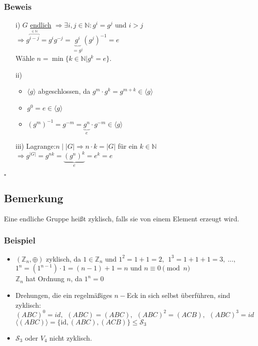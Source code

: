 \documentclass[12pt,titlepage, pdf]{article}
\newcommand{\uline}[1]{\underline{#1}}
\newcommand{\id}{\textrm{id}}
\renewcommand{\>}{\rightarrow}
\renewcommand{\*}{\cdot}
\begin{document}
	\subsubsection*{Beweis}
	\begin{itemize}
		\item[i)] $G$ \uline{endlich} $\Rightarrow \exists i,j \in \mathds{N}: g^i = g^j$ und $i > j$ \\
		\noindent\hspace*{17.5mm}$\Rightarrow g^{\overbracket{i-j}^{ \in \mathds{N}}} = g^i g^{-j} = \underbrace{g^i}_{=g^j} (g^j)^{-1} = e$ \\
		Wähle $n =\min\{k \in \mathds{N}| g^k = e \}$.
		\item[ii)] 
		\begin{itemize}
			\item $\langle g \rangle$ abgeschlossen, da $g^m \cdot g^k = g^{m+k} \in \langle g \rangle$ 
			\item $g^0 = e \in \langle g \rangle$
			\item $(g^m)^{-1} = g^{-m} = \underbrace{g^n}_{e} \cdot g^{-m} \in \langle g \rangle$
		\end{itemize}
		\item[iii)] Lagrange:\quad $n \mid |G| \Rightarrow n \cdot k = | G |$ für ein $k  \in \mathds{N}$\\
		\noindent\hspace*{32mm}$\Rightarrow g^{|G|} = g^{nk} =\underbrace{(g^n)^k}_{e} = e^k = e$
	\end{itemize}\hfill$\square$
	\subsection{Bemerkung}
	Eine endliche Gruppe heißt zyklisch, falls sie von einem Element erzeugt wird.
	\subsubsection*{Beispiel}
	\begin{itemize}
		\item $(\mathds{Z}_n, \oplus)$ zyklisch, da $1 \in \mathds{Z}_n$ und $1^2 = 1 + 1 = 2,~~ 1^3 = 1 + 1 +1 = 3,~...,$\\$ 1^n = (1^{n-1}) \cdot 1 = (n -1) + 1 = n\textrm{ und } n \equiv 0 \pmod{n}$ \\
		$\mathds{Z}_n$ hat Ordnung $n$, da $1^n = 0$
		\item Drehungen, die ein regelmäßiges $n-$Eck in sich selbst überführen, sind zyklisch: \\
		$(ABC)^0 = id,~~ (ABC) = (ABC),~~ (ABC)^2 = (ACB),~~ (ABC)^3 = id$\\
		$\langle (ABC) \rangle = \{\id, (ABC), (ACB)\} \leq \mathscr{S}_3$
		\item $\mathscr{S}_3$ oder $V_4$ nicht zyklisch.
	\end{itemize}
\end{document}
